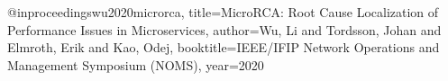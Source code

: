 @inproceedings{wu2020microrca,
  title={MicroRCA: Root Cause Localization of Performance Issues in Microservices},
  author={Wu, Li and Tordsson, Johan and Elmroth, Erik and Kao, Odej},
  booktitle={IEEE/IFIP Network Operations and Management Symposium (NOMS)},
  year={2020}
}
